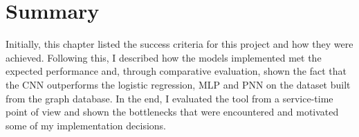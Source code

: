		\section{Summary} \label{Section: eval/summary}
			Initially, this chapter listed the success criteria for this project and how they were achieved. Following this, I described how the models implemented met the expected performance and, through comparative evaluation, shown the fact that the CNN outperforms the logistic regression, MLP and PNN on the dataset built from the graph database. In the end, I evaluated the tool from a service-time point of view and shown the bottlenecks that were encountered and motivated some of my implementation decisions. 
